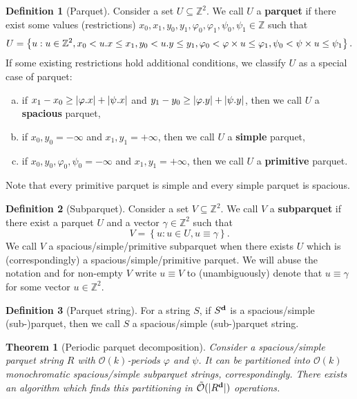 \documentclass[11pt]{article}
\newcommand{\Z}{\mathbb{Z}}
\renewcommand{\O}{\mathcal{O}}
\newcommand{\tO}{\tilde{\mathcal{O}}}
\renewcommand{\phi}{\varphi}
\newcommand{\set}[1]{\left\lbrace #1 \right\rbrace}
\theoremstyle{plain}
\newtheorem{theorem}{Theorem}
\theoremstyle{definition}
\newtheorem{definition}{Definition}
\theoremstyle{remark}
\begin{document}
\begin{definition}[Parquet]
	Consider a set $U \subseteq \Z^2$. We call $U$ a \textbf{parquet} if there exist some values (restrictions) $x_0, x_1, y_0, y_1, \phi_0, \phi_1, \psi_0, \psi_1 \in \Z$ such that
	$$ U = \set{u : u \in \Z^2, x_0 < \x{u} \le x_1, y_0 < \y{u} \le y_1, \phi_0 < \h{u} \le \phi_1, \psi_0 < \s{u} \le \psi_1}. $$
	If some existing restrictions hold additional conditions, we classify $U$ as a special case of parquet:
	\begin{enumerate}[a)]
		\item if $x_1 - x_0 \ge |\x{\phi}| + |\x{\psi}|$ and $y_1 - y_0 \ge |\y{\phi}| + |\y{\psi}|$, then we call $U$ a \textbf{spacious} parquet,
		\item if $x_0, y_0 = -\infty$ and $x_1, y_1 = +\infty$, then we call $U$ a \textbf{simple} parquet,
		\item if $x_0, y_0, \phi_0, \psi_0 = -\infty$ and $x_1, y_1 = +\infty$, then we call $U$ a \textbf{primitive} parquet.
	\end{enumerate}
	Note that every primitive parquet is simple and every simple parquet is spacious.
\end{definition}


\begin{definition}[Subparquet]
	Consider a set $V \subseteq \Z^2$. 
	We call $V$ a \textbf{subparquet} if there exist a parquet $U$ and a vector $\gamma \in \Z^2$ such that
	$$ V = \set{u : u \in U, u \equiv \gamma}.$$
	We call $V$ a spacious/simple/primitive subparquet when there exists $U$ which is (correspondingly) a spacious/simple/primitive parquet.
	We will abuse the notation and for non-empty $V$ write $u \equiv V$ to (unambiguously) denote that $u \equiv \gamma$ for some vector $u \in \Z^2$. 
\end{definition}


\begin{definition}[Parquet string]
	For a string $S$, if $S^\mathbf{d}$ is a spacious/simple (sub-)parquet, then we call $S$ a spacious/simple (sub-)parquet string.
\end{definition}


\begin{theorem}[Periodic parquet decomposition]\label{parquet_decomposition}
	Consider a spacious/simple parquet string $R$ with $\O(k)$-periods $\phi$ and $\psi$.
	It can be partitioned into $\O(k)$ monochromatic spacious/simple subparquet strings, correspondingly.
	There exists an algorithm which finds this partitioning in $\tO(|\d{R}|)$ operations.
\end{theorem}
\end{document}
